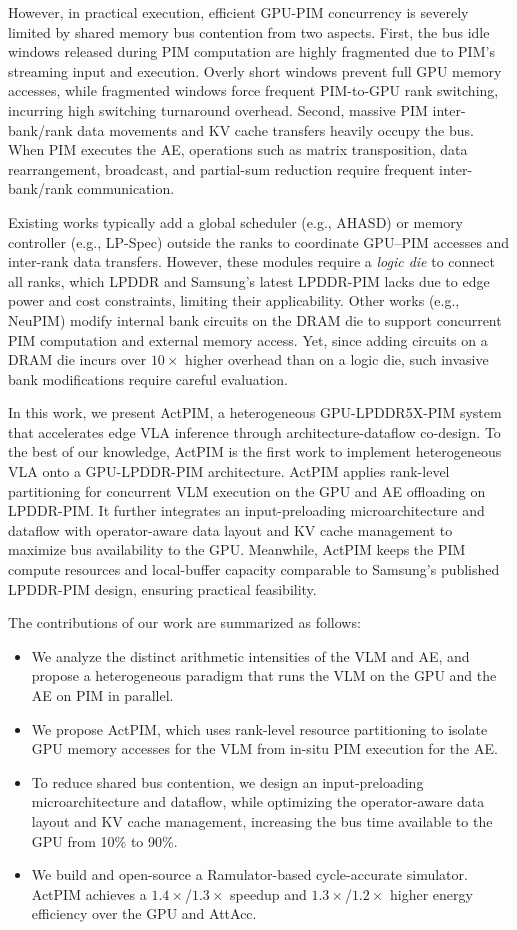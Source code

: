 However, in practical execution, efficient GPU-PIM concurrency is severely limited by shared memory bus contention from two aspects. First, the bus idle windows released during PIM computation are highly fragmented due to PIM's streaming input and execution. Overly short windows prevent full GPU memory accesses, while fragmented windows force frequent PIM-to-GPU rank switching, incurring high switching turnaround overhead. Second, massive PIM inter-bank/rank data movements and KV cache transfers heavily occupy the bus. When PIM executes the AE, operations such as matrix transposition, data rearrangement, broadcast, and partial-sum reduction require frequent inter-bank/rank communication.

Existing works typically add a global scheduler (e.g., AHASD) or memory controller (e.g., LP-Spec) outside the ranks to coordinate GPU--PIM accesses and inter-rank data transfers. However, these modules require a \emph{logic die} to connect all ranks, which LPDDR and Samsung's latest LPDDR-PIM lacks due to edge power and cost constraints, limiting their applicability. Other works (e.g., NeuPIM) modify internal bank circuits on the DRAM die to support concurrent PIM computation and external memory access. Yet, since adding circuits on a DRAM die incurs over $10\times$ higher overhead than on a logic die, such invasive bank modifications require careful evaluation.

In this work, we present ActPIM, a heterogeneous GPU-LPDDR5X-PIM system that accelerates edge VLA inference through architecture-dataflow co-design. To the best of our knowledge, ActPIM is the first work to implement heterogeneous VLA onto a GPU-LPDDR-PIM architecture. ActPIM applies rank-level partitioning for concurrent VLM execution on the GPU and AE offloading on LPDDR-PIM. It further integrates an input-preloading microarchitecture and dataflow with operator-aware data layout and KV cache management to maximize bus availability to the GPU. Meanwhile, ActPIM keeps the PIM compute resources and local-buffer capacity comparable to Samsung's published LPDDR-PIM design, ensuring practical feasibility.

The contributions of our work are summarized as follows:

\begin{itemize}
    \item We analyze the distinct arithmetic intensities of the VLM and AE, and propose a heterogeneous paradigm that runs the VLM on the GPU and the AE on PIM in parallel.
    \item We propose ActPIM, which uses rank-level resource partitioning to isolate GPU memory accesses for the VLM from in-situ PIM execution for the AE.
    \item To reduce shared bus contention, we design an input-preloading microarchitecture and dataflow, while optimizing the operator-aware data layout and KV cache management, increasing the bus time available to the GPU from 10\% to 90\%.
    \item We build and open-source a Ramulator-based cycle-accurate simulator. ActPIM achieves a $1.4\times$/$1.3\times$ speedup and $1.3\times$/$1.2\times$ higher energy efficiency over the GPU and AttAcc.
\end{itemize}
